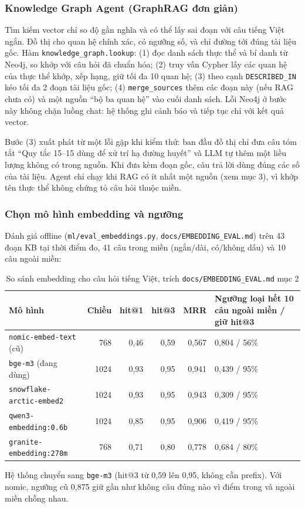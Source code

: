 \subsubsection{Knowledge Graph Agent (GraphRAG đơn giản)}
Tìm kiếm vector chỉ so độ gần nghĩa và có thể lấy sai đoạn với câu tiếng Việt ngắn. Đồ thị cho quan hệ chính xác, có ngưỡng số, và chỉ đường tới đúng tài liệu gốc. Hàm \texttt{knowledge\_graph.lookup}: (1) đọc danh sách thực thể và bí danh từ Neo4j, so khớp với câu hỏi đã chuẩn hóa; (2) truy vấn Cypher lấy các quan hệ của thực thể khớp, xếp hạng, giữ tối đa 10 quan hệ; (3) theo cạnh \texttt{DESCRIBED\_IN} kéo tối đa 2 đoạn tài liệu gốc; (4) \texttt{merge\_sources} thêm các đoạn này (nếu RAG chưa có) và một nguồn “bộ ba quan hệ” vào cuối danh sách. Lỗi Neo4j ở bước này không chặn luồng chat: hệ thống ghi cảnh báo và tiếp tục chỉ với kết quả vector.

Bước (3) xuất phát từ một lỗi gặp khi kiểm thử: ban đầu đồ thị chỉ đưa câu tóm tắt “Quy tắc 15--15 dùng để xử trí hạ đường huyết” và LLM tự thêm một liều lượng không có trong nguồn. Khi đưa kèm đoạn gốc, câu trả lời dùng đúng các số của tài liệu. Agent chỉ chạy khi RAG có ít nhất một nguồn (xem mục 3), vì khớp tên thực thể không chứng tỏ câu hỏi thuộc miền.

\subsubsection{Chọn mô hình embedding và ngưỡng}
Đánh giá offline (\texttt{ml/eval\_embeddings.py}, \texttt{docs/EMBEDDING\_EVAL.md}) trên 43 đoạn KB tại thời điểm đo, 41 câu trong miền (ngắn/dài, có/không dấu) và 10 câu ngoài miền:
\begin{table}[H]\centering\small
\begin{tabular}{lrrrrp{3.6cm}}\toprule
Mô hình & Chiều & hit@1 & hit@3 & MRR & Ngưỡng loại hết 10 câu ngoài miền / giữ hit@3\\\midrule
\texttt{nomic-embed-text} (cũ) & 768 & 0,46 & 0,59 & 0,567 & 0,804 / 56\%\\
\texttt{bge-m3} (đang dùng) & 1024 & 0,93 & 0,95 & 0,941 & 0,439 / 95\%\\
\texttt{snowflake-arctic-embed2} & 1024 & 0,93 & 0,95 & 0,943 & 0,309 / 95\%\\
\texttt{qwen3-embedding:0.6b} & 1024 & 0,85 & 0,95 & 0,906 & 0,419 / 95\%\\
\texttt{granite-embedding:278m} & 768 & 0,71 & 0,80 & 0,778 & 0,684 / 80\%\\\bottomrule
\end{tabular}\caption{So sánh embedding cho câu hỏi tiếng Việt, trích \texttt{docs/EMBEDDING\_EVAL.md} mục 2}\end{table}
Hệ thống chuyển sang \texttt{bge-m3} (hit@3 từ 0,59 lên 0,95, không cần prefix). Với nomic, ngưỡng cũ 0,875 giữ gần như không câu đúng nào vì điểm trong và ngoài miền chồng nhau.

